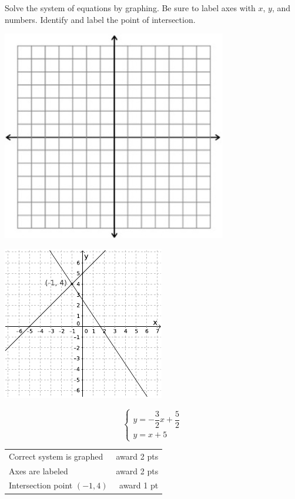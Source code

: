 {
	Solve the system of equations by graphing. Be sure to label axes with $x$, $y$, and numbers. Identify and label the point of intersection. \begin{onlyproblem}\begin{center}\includegraphics{fig-graphpaper.png}\end{center}\end{onlyproblem} \begin{onlysolution}\begin{center}\includegraphics{fig095-10-5-a-answer}\end{center}\end{onlysolution}
	$$\begin{cases} y=-\dfrac{3}{2}x+\dfrac{5}{2}\\ y=x+5\end{cases}$$
}
{
	\begin{tabular}{l r}
	Correct system is graphed & award 2 pts\\
	Axes are labeled & award 2 pts\\
	Intersection point $(-1,4)$ & award 1 pt
	\end{tabular}
}

